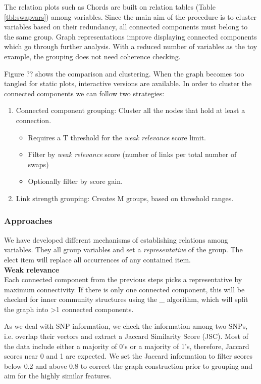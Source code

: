 The relation plots such as Chords are built on relation tables (Table \ref{tbl:swapvars}) among variables. Since the main aim of the procedure is to cluster variables based on their redundancy, all connected components must belong to the same group.
Graph representations improve displaying connected components which go through further analysis. With a reduced number of variables as the toy example, the grouping does not need coherence checking.

Figure ?? shows the comparison and clustering. When the graph becomes too tangled for static plots, interactive versions are available.
In order to cluster the connected components we can follow two strategies:

\begin{enumerate}
    \item Connected component grouping: Cluster all the nodes that hold at least a connection.
    \begin{itemize}
        \item Requires a T threshold for the \emph{weak relevance} score limit.
        \item Filter by \emph{weak relevance} score (number of links per total number of swaps)
        \item Optionally filter by score gain.
    \end{itemize}
    
    \item Link strength grouping: Creates M groups, based on threshold ranges.
\end{enumerate}


\subsubsection{Approaches}
\label{methods:grouping:approaches}
We have developed different mechanisms of establishing relations among variables. They all group variables and set a \textit{representative} of the group. The elect item will replace all occurrences of any contained item.
\\

\textbf{Weak relevance}\\
Each connected component from the previous steps picks a representative by maximum connectivity. If there is only one connected component, this will be checked for inner community structures using the \_ algorithm, which will split the graph into >1 connected components.

As we deal with SNP information, we check the information among two SNPs, i.e. overlap their vectors and extract a Jaccard Similarity Score (JSC). Most of the data include either a majority of 0's or a majority of 1's, therefore, Jaccard scores near 0 and 1 are expected. We set the Jaccard information to filter scores below 0.2 and above 0.8 to correct the graph construction prior to grouping and aim for the highly similar features.
\\

